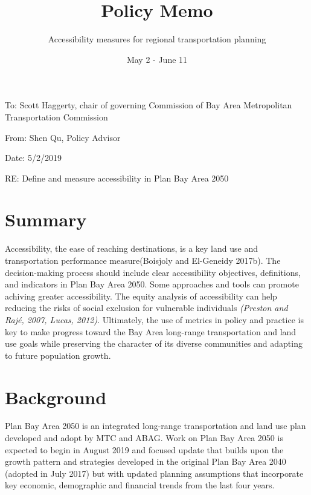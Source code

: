 \documentclass[12pt,]{article}
\title{Policy Memo}
\subtitle{Accessibility measures for regional transportation planning}
\author{}
\date{May 2 - June 11}
\begin{document}
\maketitle

To: Scott Haggerty, chair of governing Commission of Bay Area
Metropolitan Transportation Commission

From: Shen Qu, Policy Advisor

Date: 5/2/2019

RE: Define and measure accessibility in Plan Bay Area 2050

\hypertarget{summary}{%
\section{Summary}\label{summary}}

Accessibility, the ease of reaching destinations, is a key land use and
transportation performance measure(Boisjoly and El-Geneidy 2017b). The
decision-making process should include clear accessibility objectives,
definitions, and indicators in Plan Bay Area 2050. Some approaches and
tools can promote achiving greater accessibility. The equity analysis of
accessibility can help reducing the risks of social exclusion for
vulnerable individuals \emph{(Preston and Rajé, 2007, Lucas, 2012)}.
Ultimately, the use of metrics in policy and practice is key to make
progress toward the Bay Area long-range transportation and land use
goals while preserving the character of its diverse communities and
adapting to future population growth.

\hypertarget{background}{%
\section{Background}\label{background}}

Plan Bay Area 2050 is an integrated long-range transportation and land
use plan developed and adopt by MTC and ABAG. Work on Plan Bay Area 2050
is expected to begin in August 2019 and focused update that builds upon
the growth pattern and strategies developed in the original Plan Bay
Area 2040 (adopted in July 2017) but with updated planning assumptions
that incorporate key economic, demographic and financial trends from the
last four years.
\end{document}
